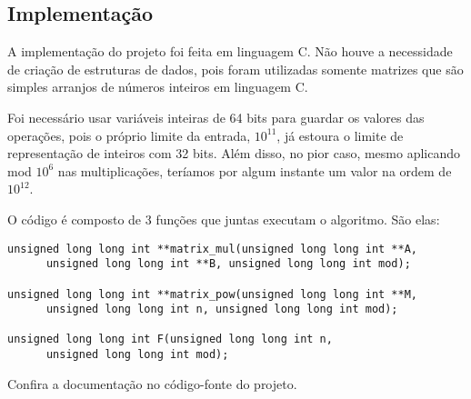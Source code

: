 	\subsection{Implementação}
		
A implementação do projeto foi feita em linguagem C. Não houve a necessidade de criação de estruturas de dados, pois foram utilizadas somente matrizes que são simples arranjos de números inteiros em linguagem C.

Foi necessário usar variáveis inteiras de 64 bits para guardar os valores das operações, pois o próprio limite da entrada, $10^{11}$, já estoura o limite de representação de inteiros com 32 bits. Além disso, no pior caso, mesmo aplicando mod $10^{6}$ nas multiplicações, teríamos por algum instante um valor na ordem de $10^{12}$.

O código é composto de 3 funções que juntas executam o algoritmo. São elas:
\begin{verbatim}
unsigned long long int **matrix_mul(unsigned long long int **A,
      unsigned long long int **B, unsigned long long int mod);

unsigned long long int **matrix_pow(unsigned long long int **M,
      unsigned long long int n, unsigned long long int mod);

unsigned long long int F(unsigned long long int n,
      unsigned long long int mod);
\end{verbatim}

Confira a documentação no código-fonte do projeto.
